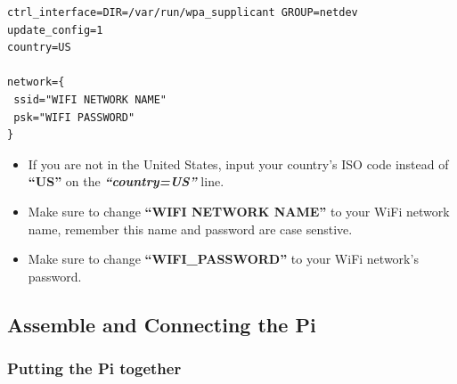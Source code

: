 \documentclass{article}
\begin{document}
\begin{enumerate}
\begin{lstlisting}
ctrl_interface=DIR=/var/run/wpa_supplicant GROUP=netdev
update_config=1
country=US

network={
 ssid="WIFI NETWORK NAME"
 psk="WIFI PASSWORD"
}
\end{lstlisting}

  \begin{itemize}
  \item If you are not in the United States, input your country's ISO code instead of \textbf{``US''} on the \textbf{\textit{``country=US''}} line.
  \item Make sure to change \textbf{``WIFI NETWORK NAME''} to your WiFi network name, remember this name and password are case senstive.
  \item Make sure to change \textbf{``WIFI\_PASSWORD''} to your WiFi network's password.
  \end{itemize}
  
\end{enumerate}

\subsection{Assemble and Connecting the Pi}

\subsubsection{Putting the Pi together}
\end{document}
